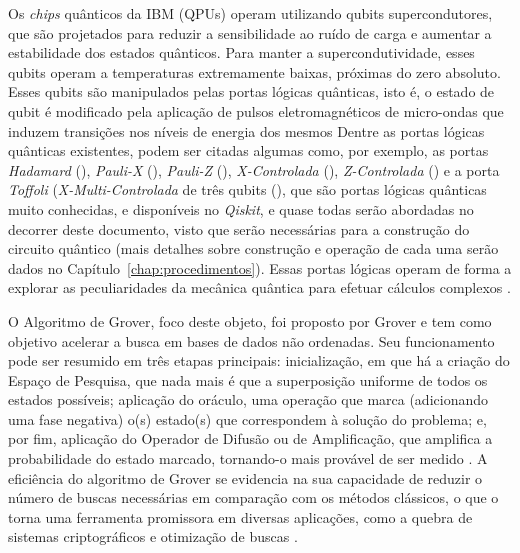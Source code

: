 Os \textit{chips} qu\^{a}nticos da IBM (QPUs) operam utilizando qubits supercondutores, que s\~{a}o projetados para reduzir a sensibilidade ao ruído de carga e aumentar a estabilidade dos estados qu\^{a}nticos. Para manter a supercondutividade, esses qubits operam a temperaturas extremamente baixas, próximas do zero absoluto. Esses qubits s\~{a}o manipulados pelas portas lógicas qu\^{a}nticas, isto \'{e}, o estado de qubit \'{e} modificado pela aplicaç\~{a}o de pulsos eletromagn\'{e}ticos de micro-ondas que induzem transições nos níveis de energia dos mesmos \cite{EITCA2024_CQ}
Dentre as portas lógicas qu\^{a}nticas existentes, podem ser citadas algumas como, por exemplo, as portas \emph{Hadamard} (), \emph{Pauli-X} (), \emph{Pauli-Z} (), \emph{X-Controlada} (), \emph{Z-Controlada} () e a porta  \emph{Toffoli} (\emph{X-Multi-Controlada} de tr\^{e}s qubits (), que s\~{a}o portas lógicas qu\^{a}nticas muito conhecidas, e disponíveis no \emph{Qiskit}, e quase todas ser\~{a}o abordadas no decorrer deste documento, visto que ser\~{a}o necess\'{a}rias para a construç\~{a}o do circuito qu\^{a}ntico (mais detalhes sobre construç\~{a}o e operaç\~{a}o de cada uma ser\~{a}o dados no Cap\'{i}tulo~\ref{chap:procedimentos}). Essas portas lógicas operam de forma a explorar as peculiaridades da mec\^{a}nica qu\^{a}ntica para efetuar c\'{a}lculos complexos \cite{Nielsen_Chuang2010_Livro}.

O Algoritmo de Grover, foco deste objeto, foi proposto por Grover \citeyear{grover1996} e tem como objetivo acelerar a busca em bases de dados n\~{a}o ordenadas. Seu funcionamento pode ser resumido em tr\^{e}s etapas principais: inicializaç\~{a}o, em que h\'{a} a criaç\~{a}o do Espaço de Pesquisa, que nada mais \'{e} que a superposiç\~{a}o uniforme de todos os estados possíveis; aplicaç\~{a}o do or\'{a}culo, uma operaç\~{a}o que marca (adicionando uma fase negativa) o(s) estado(s) que correspondem à soluç\~{a}o do problema; e, por fim, aplicaç\~{a}o do Operador de Difus\~{a}o ou de Amplificaç\~{a}o, que amplifica a probabilidade do estado marcado, tornando-o mais prov\'{a}vel de ser medido \cite{qiskit_GroverNotebook}. A efici\^{e}ncia do algoritmo de Grover se evidencia na sua capacidade de reduzir o número de buscas necess\'{a}rias em comparaç\~{a}o com os m\'{e}todos cl\'{a}ssicos, o que o torna uma ferramenta promissora em diversas aplicações, como a quebra de sistemas criptogr\'{a}ficos e otimizaç\~{a}o de buscas \cite{grover1996}.

